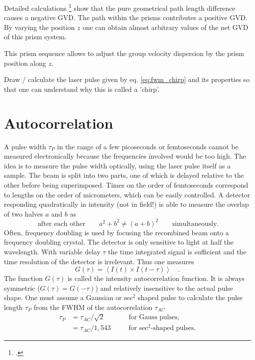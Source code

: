 Detailed calculations \footcite{DielsRudolph1996} show that the pure geometrical path length difference causes a negative GVD. The path within the prisms contributes a positive GVD.  By varying the position $z$ one can obtain almost arbitrary values of the net GVD of this prism system.


\begin{marginfigure}
\caption{This prism sequence allows to adjust the group velocity dispersion by the prism position along $z$. }
\label{fig:fwm_prism}
\end{marginfigure}


\begin{questions}
\item Draw / calculate the laser pulse  given by eq. \ref{eq:fwm_chirp} and its properties so that one can understand why this is called a 'chirp'.
\end{questions}



\section{Autocorrelation}

A pulse width $\tau_P$ in the range of a few picoseconds or femtoseconds cannot be measured electronically because the frequencies involved would be too high. The idea is to measure the pulse width optically, using the laser pulse itself as a sample. The beam is split into two parts, one of which is delayed relative to the other before being superimposed.  Times on the order of femtoseconds correspond to lengths on the order of micrometers, which can be easily controlled. A detector responding quadratically in intensity (not in field!) is able to measure the overlap of two halves $a$ and $b$ as
\begin{equation}
 \ \text{after each other} \qquad a^2 + b^2 \neq (a+b)^2 \qquad
 \text{simultaneously.}
\end{equation}
Often, frequency doubling is used by focusing the recombined beam onto a frequency doubling crystal. The detector is only sensitive to light at half the wavelength. With variable delay $\tau$ the time integrated signal is sufficient and the time resolution of the detector is irrelevant. Thus one measures
\begin{equation}
  G(\tau) = \left< I(t) \times I(t-\tau) \right> \quad.
\end{equation}
The function $G(\tau)$ is called the intensity autocorrelation function. It is always symmetric ($G(\tau) = G(-\tau)$) and relatively insensitive to the actual pulse shape.  One must assume a Gaussian or $\text{sec}^2$ shaped pulse to calculate the pulse length $\tau_{P} $ from the FWHM of the autocorrelation
$\tau_{AC}$ 
\begin{align}
  \tau_{P} &= \tau_{AC} / \sqrt{2} &\quad& \text{for Gauss pulses,} \\
           &= \tau_{AC} / 1,543 && \text{for $\text{sec}^2$-shaped pulses.}
\end{align}


